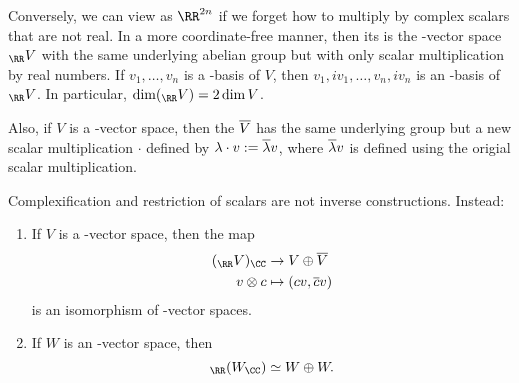 \documentclass{scrartcl}
\begin{document}
Conversely, we can view \CC[n] as $\RR^{2n}$ if we forget how to multiply by complex scalars that are not real. In a more coordinate-free manner, then its  is the \RR-vector space $_{\RR} V$ with the same underlying abelian group but with only scalar multiplication by real numbers. If $v_1,\dots,v_n$ is a \CC-basis of $V$, then $v_1, iv_1,\dots,v_n,iv_n$ is an \RR-basis of $_{\RR} V$. In particular, $\dim(_{\RR} V) = 2\dim V$.

Also, if $V$ is a \CC-vector space, then the  $\overline{V}$ has the same underlying group but a new scalar multiplication $\cdot$ defined by $\lambda\cdot v := \overline{\lambda}v$, where $\overline{\lambda}v$ is defined using the origial scalar multiplication.

Complexification and restriction of scalars are not inverse constructions. Instead:
\begin{proposition}
    \hfill
    \begin{enumerate}[font=\normalfont]
        \item If $V$ is a \CC-vector space, then the map \begin{align*}
            (_{\RR} V)_{\CC} &\rightarrow V \oplus \ol{V} \\
            v\otimes c &\mapsto (cv,\ol{c}v) \\
        \end{align*} is an isomorphism of \CC-vector spaces.
        \item If $W$ is an \RR-vector space, then \[_{\RR}(W_{\CC}) \simeq W\oplus W.\]
    \end{enumerate}
\end{proposition}



\end{document}
